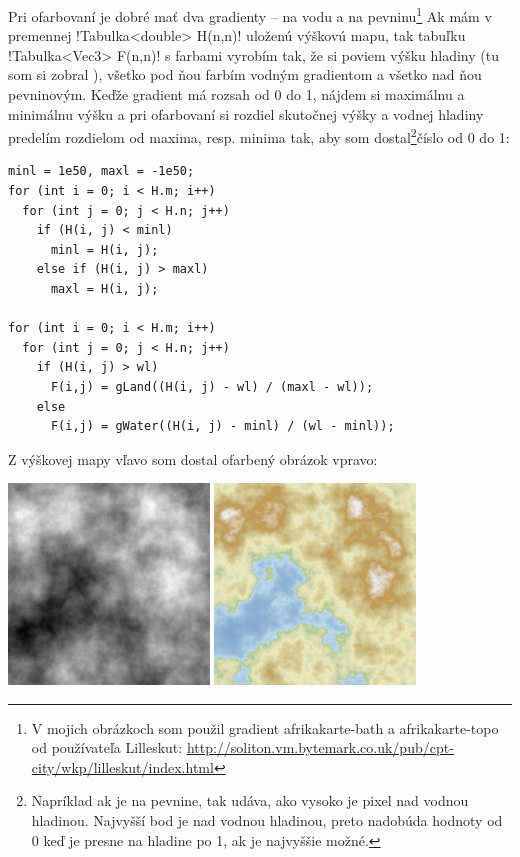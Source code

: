 Pri ofarbovaní je dobré mať dva gradienty --  na vodu a 
 na pevninu\footnote{
  V mojich obrázkoch som použil gradient {\sffamily afrikakarte-bath} a {\sffamily afrikakarte-topo}
  od používateľa {\sffamily Lilleskut}: 
  \hbox{\url{http://soliton.vm.bytemark.co.uk/pub/cpt-city/wkp/lilleskut/index.html}}}
Ak mám v premennej \prg!Tabulka<double> H(n,n)! uloženú výškovú mapu, tak tabuľku
\prg!Tabulka<Vec3> F(n,n)! s farbami vyrobím tak, že si poviem výšku hladiny
 (tu som si zobral ), 
všetko pod ňou farbím vodným gradientom a všetko nad ňou pevninovým.
Keďže gradient má rozsah od 0 do 1, nájdem si maximálnu a minimálnu výšku
a pri ofarbovaní si rozdiel skutočnej výšky a vodnej hladiny predelím rozdielom
od maxima, resp. minima tak, aby som dostal\footnote{%
  Napríklad ak  je na pevnine, tak  udáva, ako vysoko je pixel nad vodnou hladinou.
  Najvyšší bod je  nad vodnou hladinou, preto 
  nadobúda hodnoty od 0 keď  je presne na hladine po 1, ak  je najvyššie možné.
}číslo od 0 do 1:


\begin{lstlisting}
minl = 1e50, maxl = -1e50;
for (int i = 0; i < H.m; i++)
  for (int j = 0; j < H.n; j++)
    if (H(i, j) < minl)
      minl = H(i, j);
    else if (H(i, j) > maxl)
      maxl = H(i, j);

for (int i = 0; i < H.m; i++)
  for (int j = 0; j < H.n; j++)
    if (H(i, j) > wl)
      F(i,j) = gLand((H(i, j) - wl) / (maxl - wl));
    else
      F(i,j) = gWater((H(i, j) - minl) / (wl - minl));
\end{lstlisting}


Z výškovej mapy vľavo som dostal ofarbený obrázok vpravo:\\


\centerline{
  \includegraphics[width=0.4\textwidth]{data/perlin_comb_render_heightmap.png}
  \hskip 1cm
  \includegraphics[width=0.4\textwidth]{data/perlin_comb_render_colored.png}
}

